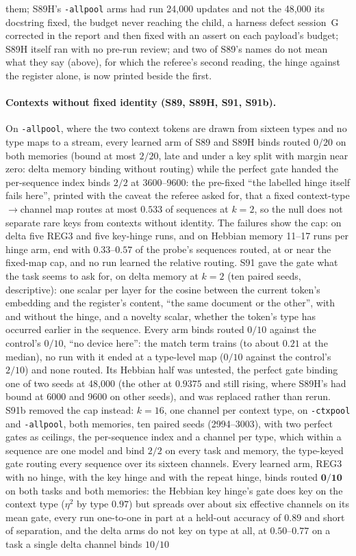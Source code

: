 \documentclass[11pt]{article}
\begin{document}
them; S89H's \texttt{-allpool} arms had run 24{,}000 updates and not the 48{,}000 its docstring fixed, the budget never reaching the child, a harness defect session~G corrected in the report and then fixed with an assert on each payload's budget; S89H itself ran with no pre-run review; and two of S89's names do not mean what they say (above), for which the referee's second reading, the hinge against the register alone, is now printed beside the first.

\paragraph{Contexts without fixed identity (S89, S89H, S91, S91b).} On \texttt{-allpool}, where the two context tokens are drawn from sixteen types and no type maps to a stream, every learned arm of S89 and S89H binds routed $0/20$ on both memories (bound at most $2/20$, late and under a key split with margin near zero: delta memory binding without routing) while the perfect gate handed the per-sequence index binds $2/2$ at 3600--9600: the pre-fixed ``the labelled hinge itself fails here'', printed with the caveat the referee asked for, that a fixed context-type$\to$channel map routes at most $0.533$ of sequences at $k = 2$, so the null does not separate rare keys from contexts without identity. The failures show the cap: on delta five REG3 and five key-hinge runs, and on Hebbian memory 11--17 runs per hinge arm, end with $0.33$--$0.57$ of the probe's sequences routed, at or near the fixed-map cap, and no run learned the relative routing. S91 gave the gate what the task seems to ask for, on delta memory at $k = 2$ (ten paired seeds, descriptive): one scalar per layer for the cosine between the current token's embedding and the register's content, ``the same document or the other'', with and without the hinge, and a novelty scalar, whether the token's type has occurred earlier in the sequence. Every arm binds routed $0/10$ against the control's $0/10$, ``no device here'': the match term trains (to about $0.21$ at the median), no run with it ended at a type-level map ($0/10$ against the control's $2/10$) and none routed. Its Hebbian half was untested, the perfect gate binding one of two seeds at 48{,}000 (the other at $0.9375$ and still rising, where S89H's had bound at 6000 and 9600 on other seeds), and was replaced rather than rerun. S91b removed the cap instead: $k = 16$, one channel per context type, on \texttt{-ctxpool} and \texttt{-allpool}, both memories, ten paired seeds (2994--3003), with two perfect gates as ceilings, the per-sequence index and a channel per type, which within a sequence are one model and bind $2/2$ on every task and memory, the type-keyed gate routing every sequence over its sixteen channels. Every learned arm, REG3 with no hinge, with the key hinge and with the repeat hinge, binds routed $\mathbf{0/10}$ on both tasks and both memories: the Hebbian key hinge's gate does key on the context type ($\eta^2$ by type $0.97$) but spreads over about six effective channels on its mean gate, every run one-to-one in part at a held-out accuracy of $0.89$ and short of separation, and the delta arms do not key on type at all, at $0.50$--$0.77$ on a task a single delta channel binds $10/10$ 
\end{document}

